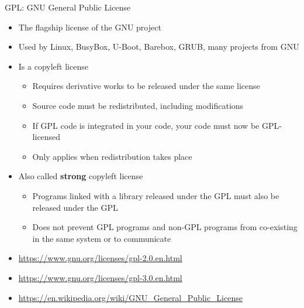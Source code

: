 \begin{frame}{GPL: GNU General Public License}
  \begin{itemize}
  \item The flagship license of the GNU project
  \item Used by Linux, BusyBox, U-Boot, Barebox, GRUB, many projects from GNU
  \item Is a copyleft license
    \begin{itemize}
    \item Requires derivative works to be released under the same
      license
    \item Source code must be redistributed, including modifications
    \item If GPL code is integrated in your code, your code must now
      be GPL-licensed
    \item Only applies when redistribution takes place
    \end{itemize}
  \item Also called {\bf strong} copyleft license
    \begin{itemize}
    \item Programs linked with a library released under the GPL must
      also be released under the GPL
    \item Does not prevent GPL programs and non-GPL programs from
      co-existing in the same system or to communicate
    \end{itemize}
  \item \url{https://www.gnu.org/licenses/gpl-2.0.en.html}
  \item \url{https://www.gnu.org/licenses/gpl-3.0.en.html}
  \item \url{https://en.wikipedia.org/wiki/GNU_General_Public_License}
  \end{itemize}
\end{frame}

